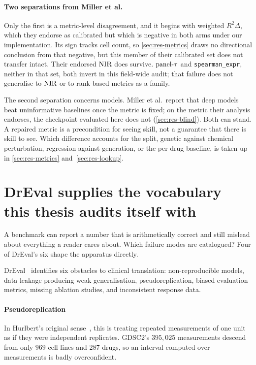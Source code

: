 \paragraph{Two separations from Miller et al.} Only the first is a metric-level
disagreement, and it begins with weighted $R^2\Delta$, which
they endorse as calibrated but which is negative in both arms under our
implementation. Its sign tracks cell count, so \cref{sec:res-metrics} draws no
directional conclusion from that negative, but this member of their calibrated
set does not transfer intact. Their endorsed $\textrm{NIR}$ does survive. $\textrm{panel-}\tau$ and
\texttt{spearman\_expr}, neither in that set, both invert in this field-wide
audit; that failure does not generalise to $\textrm{NIR}$ or to rank-based metrics as a
family.

The second separation concerns models. Miller et al.\ report that deep models
beat uninformative baselines once the metric is fixed; on the metric their
analysis endorses, the checkpoint evaluated here does not
(\cref{sec:res-blind}). Both can stand. A repaired metric is a precondition for
seeing skill, not a guarantee that there is skill to see. Which difference
accounts for the split, genetic against chemical perturbation, regression against
generation, or the per-drug baseline, is taken up in \cref{sec:res-metrics}
and~\cref{sec:res-lookup}.

\section{DrEval supplies the vocabulary this thesis audits itself with}
\label{sec:lit-dreval}
\framedecl{-}

\begin{question}
A benchmark can report a number that is arithmetically correct and still mislead
about everything a reader cares about. Which failure modes are catalogued? Four
of DrEval's six shape the apparatus directly.
\end{question}

\noindent
DrEval~\cite{dreval} identifies six obstacles to clinical translation:
non-reproducible models, data leakage producing weak generalisation,
pseudoreplication, biased evaluation metrics, missing ablation studies, and
inconsistent response data.

\paragraph{Pseudoreplication} In Hurlbert's original sense~\cite{hurlbert}, this
is treating repeated measurements of one unit as if they were independent
replicates. GDSC2's $395{,}025$ measurements descend from only $969$ cell lines
and $287$ drugs, so an interval computed over measurements is badly
overconfident.

